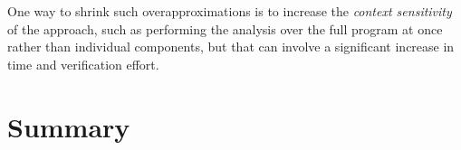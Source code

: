 One way to shrink such overapproximations is to increase the
\emph{context sensitivity}
of the approach, such as performing the analysis over the full program at once
rather than individual components, but that can involve
a significant increase in time and verification effort.


\section{Summary}
